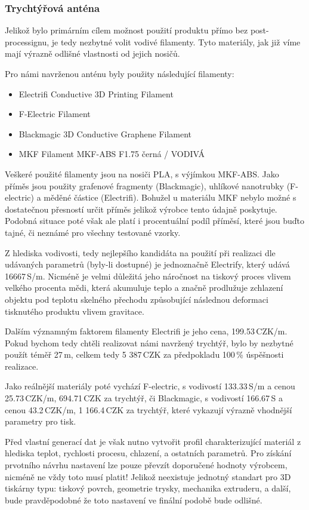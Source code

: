 \subsubsection{Trychtýřová anténa}
Jelikož bylo primárním cílem možnost použití produktu přímo bez post-processignu, je tedy nezbytné volit vodivé filamenty. Tyto materiály, jak již víme mají výrazně odlišné vlastnosti od jejich nosičů.

Pro námi navrženou anténu byly použity následující filamenty:
\begin{itemize}
\item Electrifi Conductive 3D Printing Filament
\item F-Electric Filament
\item Blackmagic 3D Conductive Graphene Filament
\item MKF Filament MKF-ABS F1.75 černá / VODIVÁ
\end{itemize}

Veškeré použité filamenty jsou na nosiči PLA, s výjímkou MKF-ABS. Jako příměs jsou použity grafenové fragmenty (Blackmagic), uhlíkové nanotrubky (F-electric) a měděné částice (Electrifi). Bohužel u materiálu MKF nebylo možné s dostatečnou přesností určit příměs jelikož výrobce tento údajně poskytuje. Podobná situace poté však ale platí i procentuální podíl příměsí, které jsou buďto tajné, či neznámé pro všechny testované vzorky.

Z hlediska vodivosti, tedy nejlepšího kandidáta na použití při realizaci dle udávaných parametrů (byly-li dostupné) je jednoznačně Electrify, který udává 16667\,S/m. Nicméně je velmi důležitá jeho náročnost na tiskový proces vlivem velkého procenta mědi, která akumuluje teplo a značně prodlužuje zchlazení objektu pod teplotu skelného přechodu způsobující následnou deformaci tisknutého produktu vlivem gravitace.

Dalším významným faktorem filamenty Electrifi je jeho cena, 199.53\,CZK/m. Pokud bychom tedy chtěli realizovat námi navržený trychtýř, bylo by nezbytné použít téměř 27\,m, celkem tedy 5 387\,CZK za předpokladu 100\,\% úspěšnosti realizace.

Jako reálnější materiály poté vychází F-electric, s vodivostí 133.33\,S/m a cenou 25.73\,CZK/m, 694.71\,CZK za trychtýř, či Blackmagic, s vodivostí 166.67\,S a cenou 43.2\,CZK/m, 1 166.4\,CZK za trychtýř, které vykazují výrazně vhodnější parametry pro tisk.

Před vlastní generací dat je však nutno vytvořit profil charakterizující materiál z hlediska teplot, rychlosti procesu, chlazení, a ostatních parametrů. Pro získání prvotního návrhu nastavení lze pouze převzít doporučené hodnoty výrobcem, nicméně ne vždy toto musí platit! Jelikož neexistuje jednotný standart pro 3D tiskárny typu: tiskový povrch, geometrie trysky, mechanika extruderu, a další, bude pravděpodobné že toto nastavení ve finální podobě bude odlišné.

